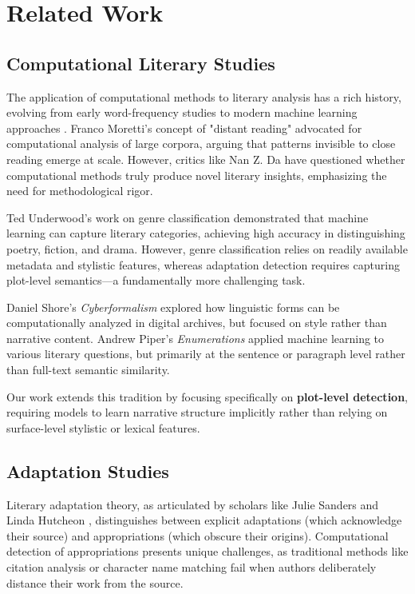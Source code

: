 \documentclass[12pt,a4paper]{article}
\begin{document}
\section{Related Work}

\subsection{Computational Literary Studies}

The application of computational methods to literary analysis has a rich history, evolving from early word-frequency studies \cite{Burrows1987} to modern machine learning approaches \cite{Piper2018}. Franco Moretti's concept of "distant reading" \cite{Moretti2013} advocated for computational analysis of large corpora, arguing that patterns invisible to close reading emerge at scale. However, critics like Nan Z. Da \cite{Da2019} have questioned whether computational methods truly produce novel literary insights, emphasizing the need for methodological rigor.

Ted Underwood's work on genre classification \cite{Underwood2019} demonstrated that machine learning can capture literary categories, achieving high accuracy in distinguishing poetry, fiction, and drama. However, genre classification relies on readily available metadata and stylistic features, whereas adaptation detection requires capturing plot-level semantics—a fundamentally more challenging task.

Daniel Shore's \textit{Cyberformalism} \cite{Shore2018} explored how linguistic forms can be computationally analyzed in digital archives, but focused on style rather than narrative content. Andrew Piper's \textit{Enumerations} \cite{Piper2018} applied machine learning to various literary questions, but primarily at the sentence or paragraph level rather than full-text semantic similarity.

Our work extends this tradition by focusing specifically on \textbf{plot-level detection}, requiring models to learn narrative structure implicitly rather than relying on surface-level stylistic or lexical features.

\subsection{Adaptation Studies}

Literary adaptation theory, as articulated by scholars like Julie Sanders \cite{Sanders2006} and Linda Hutcheon \cite{Hutcheon2006}, distinguishes between explicit adaptations (which acknowledge their source) and appropriations (which obscure their origins). Computational detection of appropriations presents unique challenges, as traditional methods like citation analysis or character name matching fail when authors deliberately distance their work from the source.
\end{document}
